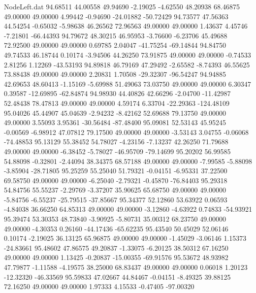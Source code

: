 \begin{filecontents}{NodeLeft.dat}
  94.68511   44.00558   49.94690    -2.19025   -4.62550   48.20938   68.46875   49.00000   49.00000    4.99442   -0.94690  -24.01882  -50.72429
  94.73577   47.56363   44.54254    -0.65032   -5.98638   46.26562   72.96563   49.00000   49.00000    1.43637    4.45746   -7.21801  -66.44393
  94.79672   48.30215   46.95953    -3.76600   -6.23706   45.49688   72.92500   49.00000   49.00000    0.69785    2.04047  -41.75254  -69.14844
  94.84750   49.74533   46.18744     0.10174   -3.94506   44.26250   73.91875   49.00000   49.00000   -0.74533    2.81256    1.12269  -43.53193
  94.89818   46.79169   47.29492    -2.65582   -8.74393   46.55625   73.88438   49.00000   49.00000    2.20831    1.70508  -29.32307  -96.54247
  94.94885   42.69653   48.60413    -1.15169   -5.69988   51.49063   73.03750   49.00000   49.00000    6.30347    0.39587  -12.69895  -62.84874
  94.98930   44.40826   42.66296    -2.04700  -11.42987   52.48438   78.47813   49.00000   49.00000    4.59174    6.33704  -22.29363 -124.48109
  95.04026   45.44907   45.04639    -2.94232   -8.42162   52.69688   79.13750   49.00000   49.00000    3.55093    3.95361  -30.56484  -87.48400
  95.09081   52.53143   45.95245    -0.00569   -6.98912   47.07812   79.17500   49.00000   49.00000   -3.53143    3.04755   -0.06068  -74.48853
  95.13129   55.38452   54.78027    -4.23156   -7.13237   42.26250   71.79688   49.00000   49.00000   -6.38452   -5.78027  -46.95709  -79.14699
  95.20202   56.99585   54.88098    -0.32801   -2.44094   38.34375   68.57188   49.00000   49.00000   -7.99585   -5.88098   -3.85904  -28.71805
  95.25259   55.25040   51.79321    -0.04151   -6.95331   37.22500   69.58750   49.00000   49.00000   -6.25040   -2.79321   -0.45870  -76.84403
  95.29318   54.84756   55.55237    -2.29769   -3.37207   35.90625   65.68750   49.00000   49.00000   -5.84756   -6.55237  -25.79515  -37.85667
  95.34377   52.12860   53.63922     0.06593   -4.84038   36.66250   64.85313   49.00000   49.00000   -3.12860   -4.63922    0.74833  -54.93921
  95.39474   53.30353   48.73840    -3.90925   -5.80731   35.00312   68.23750   49.00000   49.00000   -4.30353    0.26160  -44.17436  -65.62235
  95.43540   50.45029   52.06146     0.10174   -2.19025   36.13125   65.96875   49.00000   49.00000   -1.45029   -3.06146    1.15373  -24.83661
  95.48602   47.86575   49.20837    -1.33075   -6.20125   38.50312   67.16250   49.00000   49.00000    1.13425   -0.20837  -15.00355  -69.91576
  95.53672   48.93982   47.79877    -1.11588   -4.19575   38.25000   68.83437   49.00000   49.00000    0.06018    1.20123  -12.32320  -46.33569
  95.59833   47.02667   44.84467    -0.04151   -8.49325   39.88125   72.16250   49.00000   49.00000    1.97333    4.15533   -0.47405  -97.00320

\end{filecontents}
